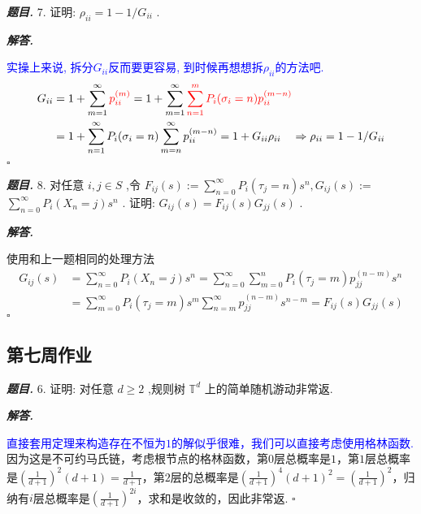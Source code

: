 \documentclass[10pt, a4paper, oneside]{ctexart}
\newenvironment{problem}{\begin{framed}\par\noindent\textbf{\textit{题目. }}}{\end{framed}\par}
\newenvironment{solution}{%
  \par\noindent\textbf{\textit{解答. }}\ignorespaces
}{%
  \hfill\ensuremath{\square}\par %
}
\begin{document}
       \begin{problem}
           7. 证明: \( {\rho }_{ii} = 1 - 1/{G}_{ii} \) .
       \end{problem}
       
       \begin{solution}
           \textcolor{blue}{实操上来说, 拆分$G_{ii}$反而要更容易, 到时候再想想拆$\rho_{ii}$的方法吧.}
           \begin{align*}
               G_{ii}&=1+\sum_{m=1}^{\infty}\textcolor{red}{p_{ii}^{(m)}}=1+\sum_{m=1}^{\infty}\textcolor{red}{\sum_{n=1}^{m}P_{i}(\sigma_i=n)p_{ii}^{(m-n)}}\\
               &=1+\sum_{n=1}^{\infty}P_{i}(\sigma_i=n)\sum_{m=n}^{\infty}p_{ii}^{(m-n)}=1+G_{ii}\rho_{ii}\quad\Rightarrow{\rho }_{ii} = 1 - 1/{G}_{ii}
           \end{align*}
       \end{solution}
       
       \begin{problem}
           8. 对任意 \( i,j \in  S \) ,令 \( {F}_{ij}\left( s\right)  \mathrel{\text{:=}} \mathop{\sum }\limits_{{n = 0}}^{\infty }{P}_{i}\left( {{\tau }_{j} = n}\right) {s}^{n},{G}_{ij}\left( s\right)  :=  \) \( \mathop{\sum }\limits_{{n = 0}}^{\infty }{P}_{i}\left( {{X}_{n} = j}\right) {s}^{n} \) . 证明: \( {G}_{ij}\left( s\right)  = {F}_{ij}\left( s\right) {G}_{jj}\left( s\right)  \) .
       \end{problem}
       
       \begin{solution}
           使用和上一题相同的处理方法 
           \begin{align*}
               G_{ij}(s)&=\sum_{n=0}^{\infty}P_i(X_n=j)s^n=\sum_{n=0}^{\infty}\sum_{m=0}^{n}P_i(\tau_j=m)p_{jj}^{(n-m)}s^n\\
               &=\sum_{m=0}^{\infty}P_i(\tau_j=m)s^m\sum_{n=m}^{\infty}p_{jj}^{(n-m)}s^{n-m}=F_{ij}(s)G_{jj}(s)
           \end{align*}
       \end{solution}

       \subsection{第七周作业}

       \begin{problem}
        6. 证明: 对任意 \( d \geq  2 \) ,规则树 \( {\mathbb{T}}^{d} \) 上的简单随机游动非常返.
    \end{problem}
    \begin{solution}
        \textcolor{blue}{直接套用定理来构造存在不恒为$1$的解似乎很难，我们可以直接考虑使用格林函数.} 因为这是不可约马氏链，考虑根节点的格林函数，第$0$层总概率是$1$，第$1$层总概率是$(\frac{1}{d+1})^2(d+1)=\frac{1}{d+1}$，第$2$层的总概率是$(\frac{1}{d+1})^4(d+1)^2=(\frac{1}{d+1})^2$，归纳有$i$层总概率是$(\frac{1}{d+1})^{2i}$，求和是收敛的，因此非常返.
    \end{solution}
    
\end{document}
